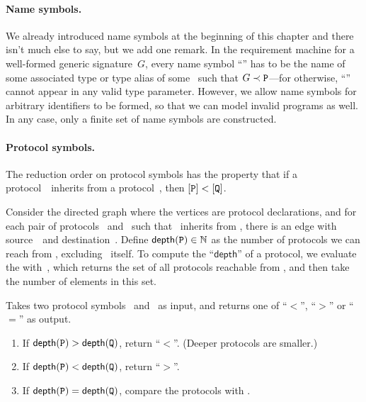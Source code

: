 \documentclass[../generics]{subfiles}
\begin{document}
\paragraph{Name symbols.}
We already introduced name symbols at the beginning of this chapter and there isn't much else to say, but we add one remark. In the requirement machine for a well-formed generic signature~$G$, every name symbol ``\nA'' has to be the name of some associated type or type alias of some \tP\ such that $G\prec\texttt{P}$---for otherwise, ``\nA'' cannot appear in any valid type parameter. However, we allow name symbols for arbitrary identifiers to be formed, so that we can model invalid programs as well. In any case, only a finite set of name symbols are constructed.

\paragraph{Protocol symbols.}
The reduction order on protocol symbols has the property that if a protocol~\tQ\ inherits from a protocol~\tP, then $[\texttt{P}]<[\texttt{Q}]$.

Consider the directed graph where the vertices are protocol declarations, and for each pair of protocols \tQ\ and \tP\ such that \tQ\ inherits from \tP, there is an edge with source~\tQ\ and destination~\tP. Define $\mathsf{depth}(\texttt{P})\in\mathbb{N}$ as the number of protocols we can reach from \tP, excluding \tP\ itself. To compute the ``$\mathsf{depth}$'' of a protocol, we evaluate the  with~\tP, which returns the set of all protocols reachable from \tP, and then take the number of elements in this set.

\begin{algorithm}\label{protocol reduction order} Takes two protocol symbols \pP\ and \pQ\ as input, and returns one of ``$<$'', ``$>$'' or ``$=$'' as output.
\begin{enumerate}
\item If $\mathsf{depth}(\texttt{P})>\mathsf{depth}(\texttt{Q})$, return ``$<$''. (Deeper protocols are smaller.)
\item If $\mathsf{depth}(\texttt{P})<\mathsf{depth}(\texttt{Q})$, return ``$>$''.
\item If $\mathsf{depth}(\texttt{P})=\mathsf{depth}(\texttt{Q})$, compare the protocols with .
\end{enumerate}
\end{algorithm}
\end{document}
